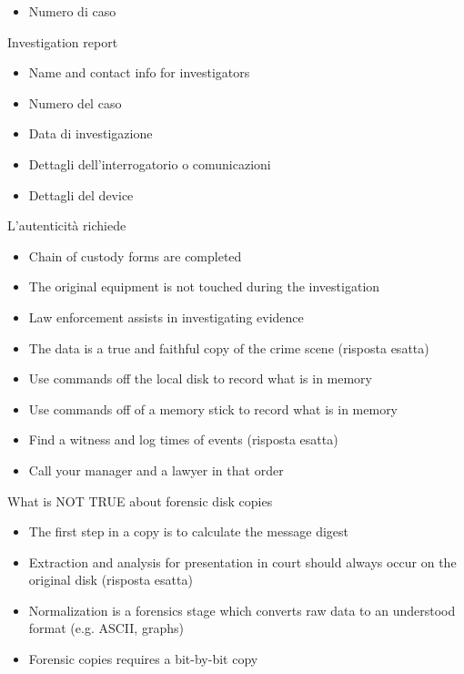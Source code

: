 \begin{itemize}
\item Numero di caso

\end{itemize}

Investigation report
\begin{itemize}
\item Name and contact info for investigators
\item Numero del caso
\item Data di investigazione
\item Dettagli dell'interrogatorio o comunicazioni
\item Dettagli del device

\end{itemize}




L'autenticità richiede
\begin{itemize}
\item Chain of custody forms are completed
\item The original equipment is not touched during the investigation
\item Law enforcement assists in investigating evidence
\item The data is a true and faithful copy of the crime scene (risposta esatta)
\end{itemize}




\begin{itemize}
\item Use commands off the local disk to record what is in memory
\item Use commands off of a memory stick to record what is in memory
\item Find a witness and log times of events (risposta  esatta)
\item Call your manager and a lawyer in that order
\end{itemize}




What is NOT TRUE about forensic disk copies
\begin{itemize}
\item The first step in a copy is to calculate the message digest
\item Extraction and analysis for presentation in court should always occur on 
the original disk (risposta esatta)
\item Normalization is a forensics stage which converts raw data to an 
understood format (e.g. ASCII, graphs)
\item Forensic copies requires a bit-by-bit copy
\end{itemize}
